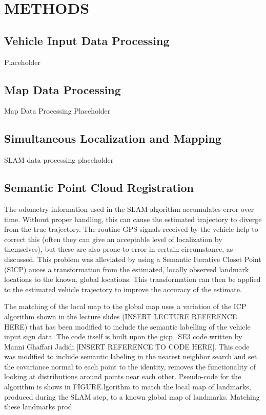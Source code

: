 \documentclass[letterpaper, 10 pt, conference]{ieeeconf}  %
\begin{document}
\section{METHODS}

\subsection{Vehicle Input Data Processing}

Placeholder

\subsection{Map Data Processing}

Map Data Processing Placeholder

\subsection{Simultaneous Localization and Mapping}

SLAM data processing placeholder

\subsection{Semantic Point Cloud Registration}
The odometry information used in the SLAM algorithm accumulates error over time. Without proper handling, this can cause the estimated trajectory to diverge from the true trajectory. The routine GPS signals received by the vehicle help to correct this (often they can give an acceptable level of localization by themselves), but these are also prone to error in certain circumstance, as discussed. This problem was alleviated by using a Semantic Iterative Closet Point (SICP) auces a transformation from the estimated, locally observed landmark locations to the known, global locations. This transformation can then be applied to the estimated vehicle trajectory to improve the accuracy of the estimate. 

The matching of the local map to the global map uses a variation of the ICP algorithm shown in the lecture slides (INSERT LECTURE REFERENCE HERE) that has been modified to include the semantic labelling of the vehicle input sign data. The code itself is built upon the gicp\_SE3 code written by Manni Ghaffari Jadidi [INSERT REFERENCE TO CODE HERE]. This code was modified to include semantic labeling in the nearest neighbor search and set the covariance normal to each point to the identity, removes the functionality of looking at distributions around points near each other. Pseudo-code for the algorithm is shows in FIGURE.lgorithm to match the local map of landmarks, produced during the SLAM step, to a known global map of landmarks. Matching these landmarks prod
\end{document}
